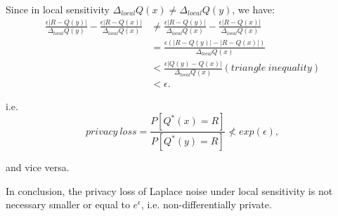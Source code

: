\documentclass{article}
\begin{document}
Since in local sensitivity $\Delta_{local} Q(x) \neq \Delta_{local} Q(y) $, we have:
\begin{equation*}
\begin{split}
\frac{\epsilon |R - Q(y)|}{\Delta_{local} Q(y)} - \frac{\epsilon |R - Q(x)|}{\Delta_{local} Q(x)}
& \neq \frac{\epsilon |R - Q(y)|}{\Delta_{local} Q(x)} - \frac{\epsilon |R - Q(x)|}{\Delta_{local} Q(x)} \\
& = \frac{\epsilon(|R - Q(y)| - |R - Q(x)|)}{\Delta_{local} Q(x)}\\
& < \frac{\epsilon|Q(y) - Q(x)|}{\Delta_{local} Q(x)} (triangle\ inequality) \\
& < \epsilon.
\end{split}
\end{equation*}

i.e.
\begin{equation*}
privacy\ loss = \frac{P[Q^{*}(x) = R]}{P[Q^{*}(y) = R]} \nless exp(\epsilon),
\end{equation*}


and vice versa.





In conclusion, the privacy loss of Laplace noise under local sensitivity is not necessary smaller or equal to $e^{\epsilon}$, i.e. non-differentially private.
\end{document}
